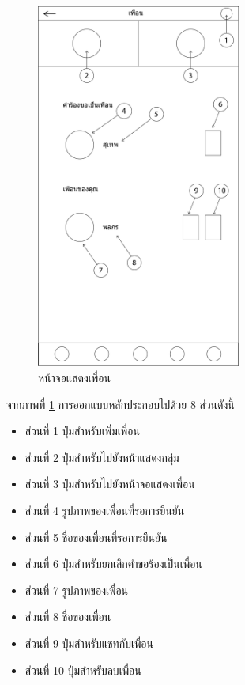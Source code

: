 		\begin{figure}[H]
			\centering
			\includegraphics[width=0.6\textwidth]{Figures/3/UI/friend}
			\caption{หน้าจอแสดงเพื่อน}
			\label{Fig:เพื่อน}
		\end{figure}
		จากภาพที่ \ref{Fig:เพื่อน} การออกแบบหลักประกอบไปด้วย 8 ส่วนดังนี้
		\begin{itemize}
			\item ส่วนที่ 1 ปุ่มสำหรับเพิ่มเพื่อน
			\item ส่วนที่ 2 ปุ่มสำหรับไปยังหน้าแสดงกลุ่ม
			\item ส่วนที่ 3 ปุ่มสำหรับไปยังหน้าจอแสดงเพื่อน
			\item ส่วนที่ 4 รูปภาพของเพื่อนที่รอการยืนยัน
			\item ส่วนที่ 5 ชื่อของเพื่อนที่รอการยืนยัน
			\item ส่วนที่ 6 ปุ่มสำหรับยกเลิกคำขอร้องเป็นเพื่อน
			\item ส่วนที่ 7 รูปภาพของเพื่อน
			\item ส่วนที่ 8 ชื่อของเพื่อน
			\item ส่วนที่ 9 ปุ่มสำหรับแชทกับเพื่อน
			\item ส่วนที่ 10 ปุ่มสำหรับลบเพื่อน
		\end{itemize}

